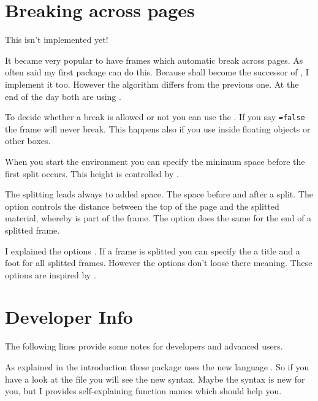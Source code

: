 \documentclass[openany,12pt,tocdepth=3]{ltx-md}
\begin{document}
\chapter{Breaking across pages}\label{chap:break}
\begin{Note}
This isn't implemented yet!
\end{Note}

It became very popular to have frames which automatic break across pages.
As often said my first package can do this. Because  shall
become the  successor of , I implement it too. However
the algorithm differs from the previous one. At the end of the day both
are using .


To decide whether a break is allowed or not you can use the .
If you say \texttt{=false} the frame will never break. This
happens also if you use  inside floating objects or other boxes. 

When you start the environment  you can specify
the minimum space before the first split occurs. This height is
controlled by . 

The splitting leads always to added space. The space
before and after a split. The option 
controls the distance between the top of the page and the splitted
material, whereby  is part of the frame. The
option  does the same for the end of
a splitted frame. 


I explained the options . If a frame is splitted
you can specify the a title and a foot for all splitted frames. However 
the options  don't loose there meaning.
These options are inspired by .

\chapter{Developer Info}\label{chap:developer-info}

The following lines provide some notes for developers and advanced users. 

As explained in the introduction these package uses the new
language . So if you have a look at the  file
you will see the new syntax. Maybe the syntax is new for you, but
I provides self-explaining function names which should help you.
\end{document}
